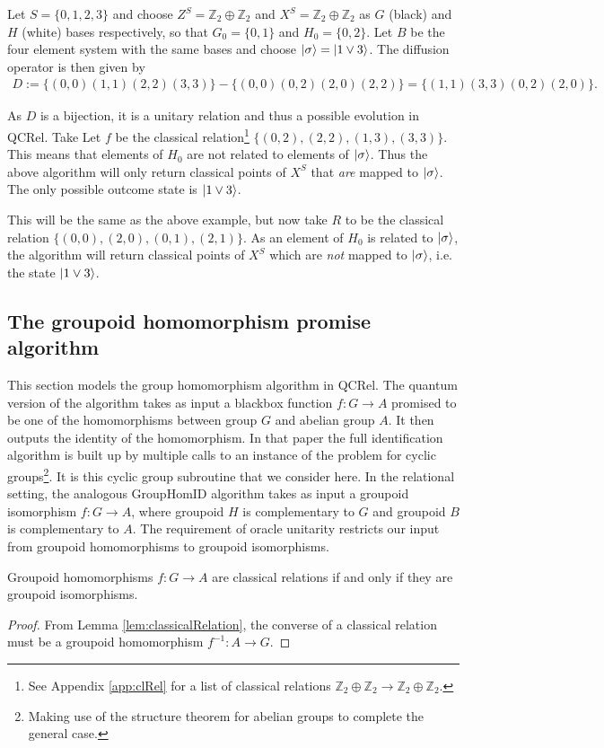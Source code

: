 \begin{example}
Let $S=\{0,1,2,3\}$ and choose $Z^S=\mathbb{Z}_2\oplus\mathbb{Z}_2$ and $X^S=\mathbb{Z}_2\oplus\mathbb{Z}_2$ as $G$ (black) and $H$ (white) bases respectively, so that $G_0=\{0,1\}$ and $H_0 = \{0,2\}$. Let $B$ be the four element system with the same bases and choose $| \sigma \rangle=| 1\vee3 \rangle$. The diffusion operator is then given by
\begin{align*}
D := \{(0,0)(1,1)(2,2)(3,3)\}-\{(0,0)(0,2)(2,0)(2,2)\}=\{(1,1)(3,3)(0,2)(2,0)\}.
\end{align*}

As $D$ is a bijection, it is a unitary relation and thus a possible evolution in QCRel.  Take Let $f$ be the classical relation\footnote{See Appendix \ref{app:clRel} for a list of classical relations $\mathbb{Z}_2\oplus\mathbb{Z}_2\to\mathbb{Z}_2\oplus\mathbb{Z}_2$.} $\{(0,2),(2,2),(1,3),(3,3)\}$.  This means that elements of $H_0$ are not related to elements of $| \sigma \rangle$. Thus the above algorithm will only return classical points of $X^{S}$ that \textit{are} mapped to $| \sigma \rangle$.  The only possible outcome state is $| 1\vee 3 \rangle$.
\end{example}

\begin{example}
This will be the same as the above example, but now take $R$ to be the classical relation $\{(0,0),(2,0),(0,1),(2,1)\}$. As an element of $H_0$ is related to $| \sigma \rangle$, the algorithm will return classical points of $X^S$ which are \emph{not} mapped to $| \sigma \rangle$, i.e. the state $| 1\vee3 \rangle$.
\end{example}

\subsection{The groupoid homomorphism promise algorithm}

This section models the group homomorphism algorithm  in QCRel.  The quantum version of the algorithm takes as input a blackbox function $f:G\to A$ promised to be one of the homomorphisms between group $G$ and abelian group $A$.  It then outputs the identity of the homomorphism. In that paper the full identification algorithm is built up by multiple calls to an instance of the problem for cyclic groups\footnote{Making use of the structure theorem for abelian groups to complete the general case.}. It is this cyclic group subroutine that we consider here. In the relational setting, the analogous GroupHomID algorithm takes as input a groupoid isomorphism $f:G\to A$, where groupoid $H$ is complementary to $G$ and groupoid $B$ is complementary to $A$.  The requirement of oracle unitarity restricts our input from groupoid homomorphisms to groupoid isomorphisms.
\begin{corollary}
Groupoid homomorphisms $f:G\to A$ are classical relations if and only if they are groupoid isomorphisms.
\end{corollary}
\begin{proof}
From Lemma \ref{lem:classicalRelation}, the converse of a classical relation must be a groupoid homomorphism $f^{-1}:A\to G$.
\end{proof}

